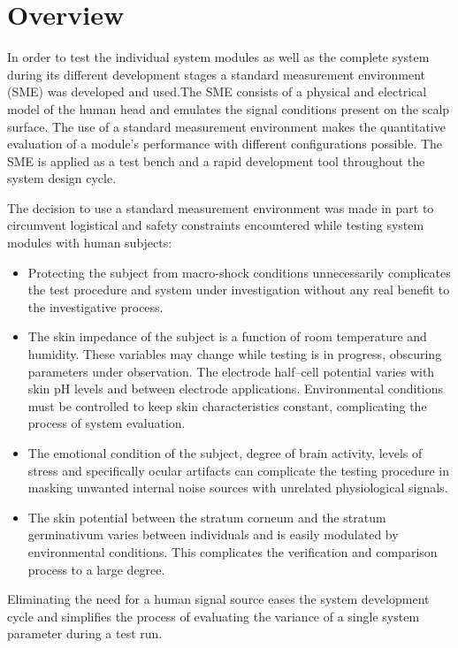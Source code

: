
\section{Overview}
In order to test the individual system modules as well as the complete
system during its different development stages a standard measurement
environment (SME) was developed and used.The SME consists of a
physical and electrical model of the human head and emulates the
signal conditions present on the scalp surface. The use of a standard
measurement environment makes the quantitative evaluation of a
module's performance with different configurations possible. The SME
is applied as a test bench and a rapid development tool throughout the
system design cycle.


The decision to use a standard measurement environment was made in
part to circumvent logistical and safety constraints encountered while
testing system modules with human subjects:

\begin{itemize}
	\item{Protecting the subject from macro-shock conditions
	unnecessarily complicates the test procedure and system under
	investigation without any real benefit to the investigative
	process.}

	\item{The skin impedance of the subject is a function of room
	temperature and humidity. These variables may change while testing
	is in progress, obscuring parameters under observation. The
	electrode half--cell potential varies with skin pH levels and
	between electrode applications. Environmental conditions must be
	controlled to keep skin characteristics constant, complicating the
	process of system evaluation.}

	\item{The emotional condition of the subject, degree of brain
	activity, levels of stress and specifically ocular artifacts can
	complicate the testing procedure in masking unwanted internal
	noise sources with unrelated physiological signals.}
	\item{The skin potential between the stratum corneum and the
	stratum germinativum varies between individuals and is easily
	modulated by environmental conditions. This complicates the
	verification and comparison process to a large degree.}
\end{itemize}

Eliminating the need for a human signal source eases the system
development cycle and simplifies the process of evaluating the
variance of a single system parameter during a test run. 

